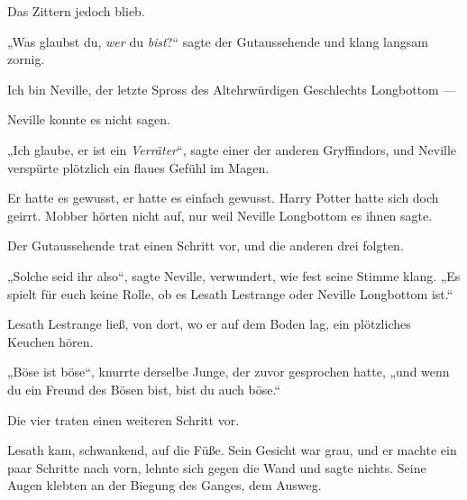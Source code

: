 Das Zittern jedoch blieb.

„Was glaubst du, \emph{wer} du \emph{bist}?“ sagte der Gutaussehende und klang langsam zornig.

Ich bin Neville, der letzte Spross des Altehrwürdigen Geschlechts Longbottom —

Neville konnte es nicht sagen.

„Ich glaube, er ist ein \emph{Verräter}“, sagte einer der anderen Gryffindors, und Neville verspürte plötzlich ein flaues Gefühl im Magen.

Er hatte es gewusst, er hatte es einfach gewusst. Harry Potter hatte sich doch geirrt. Mobber hörten nicht auf, nur weil Neville Longbottom es ihnen sagte.

Der Gutaussehende trat einen Schritt vor, und die anderen drei folgten.

„Solche seid ihr also“, sagte Neville, verwundert, wie fest seine Stimme klang.
„Es spielt für euch keine Rolle, ob es Lesath Lestrange oder Neville Longbottom ist.“

Lesath Lestrange ließ, von dort, wo er auf dem Boden lag, ein plötzliches Keuchen hören.

„Böse ist böse“, knurrte derselbe Junge, der zuvor gesprochen hatte, „und wenn du ein Freund des Bösen bist, bist du auch böse.“

Die vier traten einen weiteren Schritt vor.

Lesath kam, schwankend, auf die Füße. Sein Gesicht war grau, und er machte ein paar Schritte nach vorn, lehnte sich gegen die Wand und sagte nichts. Seine Augen klebten an der Biegung des Ganges, dem Ausweg.

